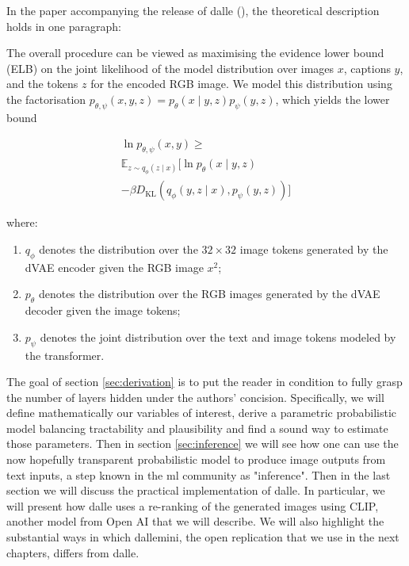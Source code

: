 \documentclass{article}
\begin{document}
\begin{multicols}{2}

In the paper accompanying the release of \gls{dalle} (\cite{zeroshot}), the theoretical description holds in one paragraph:

\begin{displayquote}
The overall procedure can be viewed as maximising the evidence lower bound (ELB) on the joint likelihood of the model distribution over images $x$, captions $y$, and the tokens $z$ for the encoded RGB image. We model this distribution using the factorisation $p_{\theta, \psi}(x, y, z)=p_{\theta}(x \mid y, z) p_{\psi}(y, z)$, which yields the lower bound

\begin{equation} \label{eq:elb_theirs}
\begin{aligned} 
\ln p_{\theta, \psi}(x, y) \geqslant  \\
\mathbb{E}_{z \sim q_{\phi}(z \mid x)} \Big[\ln p_{\theta}(x \mid y, z)\\
-\beta D_{\mathrm{KL}}\left(q_{\phi}(y, z \mid x), p_{\psi}(y, z)\right)\Big]
\end{aligned}
\end{equation}

where:
\begin{enumerate}
    \item $q_{\phi}$ denotes the distribution over the $32 \times 32$ image tokens generated by the dVAE encoder given the RGB image $x^{2}$;
    \item $p_{\theta}$ denotes the distribution over the RGB images generated by the dVAE decoder given the image tokens; 
    \item $p_{\psi}$ denotes the joint distribution over the text and image tokens modeled by the transformer.
\end{enumerate}
\end{displayquote}

The goal of section \ref{sec:derivation} is to put the reader in condition to fully grasp the number of layers hidden under the authors' concision. Specifically, we will define mathematically our variables of interest, derive a parametric probabilistic model balancing tractability and plausibility and find a sound way to estimate those parameters. Then in section \ref{sec:inference} we will see how one can use the now hopefully transparent probabilistic model to produce image outputs from text inputs, a step known in the \gls{ml} community as "inference". Then in the last section we will discuss the practical implementation of \gls{dalle}. In particular, we will present how \gls{dalle} uses a re-ranking of the generated images using CLIP, another model from Open AI that we will describe. We will also highlight the substantial ways in which \gls{dallemini}, the open replication that we use in the next chapters, differs from \gls{dalle}.


\end{multicols}
\end{document}
